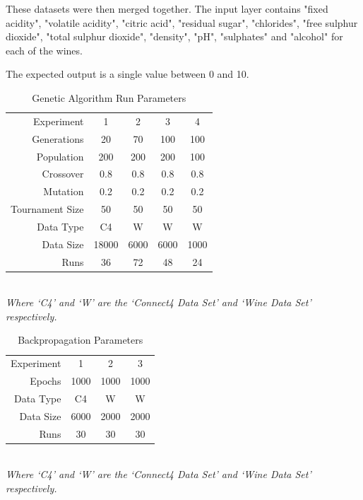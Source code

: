 \documentclass[journal]{IEEEtran}
\begin{document}
  These datasets were then merged together. The input layer contains
  "fixed acidity", "volatile acidity", "citric acid", "residual sugar", "chlorides",
  "free sulphur dioxide", "total sulphur dioxide", "density", "pH", "sulphates" and "alcohol"
  for each of the wines.

  The expected output is a single value between 0 and 10.\cite{wine}

  \begin{table}[here]
    \renewcommand{\arraystretch}{1.3}
    \caption{Genetic Algorithm Run Parameters}
    \label{E2}
    \centering
    \begin{tabular}{r|cccc}
  Experiment      & 1     & 2     & 3     & 4 \\
  Generations     & 20    & 70    & 100   & 100 \\
  Population      & 200   & 200   & 200   & 100 \\
  Crossover       & 0.8   & 0.8   & 0.8   & 0.8 \\
  Mutation        & 0.2   & 0.2   & 0.2   & 0.2 \\
  Tournament Size & 50    & 50    & 50    & 50 \\
  Data Type       & C4    & W     & W     & W \\
  Data Size       & 18000 & 6000  & 6000  & 1000 \\
  Runs            & 36    & 72    & 48    & 24 \\
    \end{tabular} \\
  \textit{Where `C4' and `W' are the `Connect4 Data Set' and `Wine Data Set' respectively.}
   \end{table}

  \begin{table}[here]
    \renewcommand{\arraystretch}{1.3}
    \caption{Backpropagation Parameters}
    \label{E2}
    \centering
    \begin{tabular}{r|ccc}
  Experiment      & 1     & 2     & 3     \\
  Epochs          & 1000  & 1000  & 1000  \\
  Data Type       & C4    & W     & W     \\
  Data Size       & 6000  & 2000  & 2000  \\
  Runs            & 30    & 30    & 30    \\
    \end{tabular} \\
  \textit{Where `C4' and `W' are the `Connect4 Data Set' and `Wine Data Set' respectively.}
   \end{table}
\end{document}
